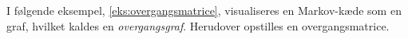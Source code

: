 



I følgende eksempel, \autoref{eks:overgangsmatrice}, visualiseres en Markov-kæde som en graf, hvilket kaldes en \textit{overgangsgraf}. Herudover opstilles en overgangsmatrice.

